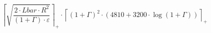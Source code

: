 \[\left\lceil \sqrt{\frac{2 \cdot Lbar \cdot R^{2}}{\left(1 + \Gamma\right) \cdot \varepsilon}} \right\rceil_{+} \cdot \left\lceil \left(1 + \Gamma\right)^{2} \cdot \left(4810 + 3200 \cdot \log\left(1 + \Gamma\right)\right) \right\rceil_{+}\]
